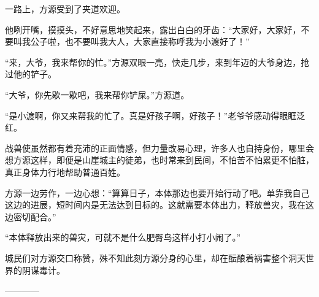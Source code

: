 \begin{this_body}
一路上，方源受到了夹道欢迎。

他咧开嘴，摸摸头，不好意思地笑起来，露出白白的牙齿：“大家好，大家好，不要叫我公子啦，也不要叫我大人，大家直接称呼我为小渡好了！”

“来，大爷，我来帮你的忙。”方源双眼一亮，快走几步，来到年迈的大爷身边，抢过他的铲子。

“大爷，你先歇一歇吧，我来帮你铲屎。”方源道。

“是小渡啊，你又来帮我的忙了。真是好孩子啊，好孩子！”老爷爷感动得眼眶泛红。

战兽使虽然都有着充沛的正面情感，但力量改易心理，许多人也自持身份，哪里会想方源这样，即便是山崖城主的徒弟，也时常来到民间，不怕苦不怕累更不怕脏，真正身体力行地帮助普通百姓。

方源一边劳作，一边心想：“算算日子，本体那边也要开始行动了吧。单靠我自己这边的进展，短时间内是无法达到目标的。这就需要本体出力，释放兽灾，我在这边密切配合。”

“本体释放出来的兽灾，可就不是什么肥臀鸟这样小打小闹了。”

城民们对方源交口称赞，殊不知此刻方源分身的心里，却在酝酿着祸害整个洞天世界的阴谋毒计。

------------

\end{this_body}

